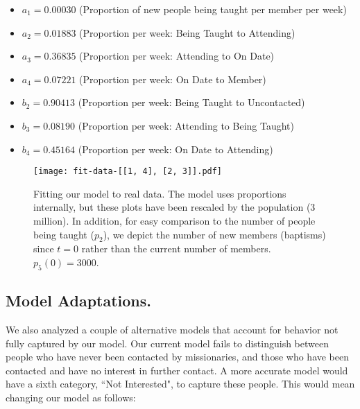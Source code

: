 \documentclass[11pt]{amsart}
\begin{document}
\begin{samepage}
\begin{itemize}
	\item $a_1 = 0.00030$ (Proportion of new people being taught per member per week)
	\item $a_2 = 0.01883$ (Proportion per week: Being Taught to Attending)
	\item $a_3 = 0.36835$ (Proportion per week: Attending to On Date)
	\item $a_4 = 0.07221$ (Proportion per week: On Date to Member)
	\item $b_2 = 0.90413$ ({Proportion} per week: Being Taught to Uncontacted)
	\item $b_3 = 0.08190$ (Proportion per week: Attending to Being Taught)
	\item $b_4 = 0.45164$ (Proportion per week: On Date to Attending)
\end{itemize}
\end{samepage}

\begin{figure}[htb]
\begin{center} %
\texttt{[image: fit-data-[[1, 4], [2, 3]].pdf]}
\end{center}
\caption{Fitting our model to real data. The model uses proportions internally, but these plots have been rescaled by the population (3 million). In addition, for easy comparison to the number of people being taught ($p_2$), we depict the number of new members (baptisms) since $t=0$ rather than the current number of members. $p_5(0) = 3000$.}
\label{fig:ShortTerm} %
\end{figure}

\begin{samepage}
\subsection*{Model Adaptations.}
\begin{center}
\hspace{0pt}
\end{center}

We also analyzed a couple of alternative models that account for behavior not fully captured by our model. Our current model fails to distinguish between people who have never been contacted by missionaries, and those who have been contacted and have no interest in further contact. A more accurate model would have a sixth category, ``Not Interested", to capture these people. This would mean changing our model as follows:
\end{samepage}
\end{document}
